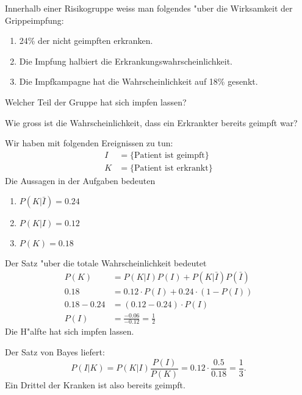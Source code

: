 Innerhalb einer Risiko\-gruppe weiss man folgendes "uber die Wirksamkeit
der Grippe\-impfung:
\begin{enumerate}
\item 24\% der nicht geimpften erkranken.
\item Die Impfung halbiert die Erkrankungswahrscheinlichkeit.
\item Die Impfkampagne hat die Wahrscheinlichkeit
auf 18\% gesenkt.
\end{enumerate}
\begin{teilaufgaben}
\item Welcher Teil der Gruppe hat sich impfen lassen?
\item Wie gross ist die Wahrscheinlichkeit, dass ein Erkrankter
bereits geimpft war?
\end{teilaufgaben}

\begin{loesung}
Wir haben mit folgenden Ereignissen zu tun:
\begin{align*}
I&=\{\text{Patient ist geimpft}\}\\
K&=\{\text{Patient ist erkrankt}\}
\end{align*}
Die Aussagen in der Aufgaben bedeuten
\begin{enumerate}
\item $P(K|\bar I)=0.24$
\item $P(K|I)=0.12$
\item $P(K)=0.18$
\end{enumerate}
\begin{teilaufgaben}
\item
Der Satz "uber die totale Wahrscheinlichkeit bedeutet
\begin{align*}
P(K)&=P(K|I)P(I)+P(K|\bar I)P(\bar I)
\\
0.18&=0.12\cdot P(I)+0.24\cdot (1-P(I))
\\
0.18-0.24&=(0.12-0.24)\cdot P(I)
\\
P(I)&=\frac{-0.06}{-0.12}=\frac12
\end{align*}
Die H"alfte hat sich impfen lassen.
\item
Der Satz von Bayes liefert:
\[
P(I|K)=P(K|I)\frac{P(I)}{P(K)}=0.12\cdot\frac{0.5}{0.18}=\frac13.
\]
Ein Drittel der Kranken ist also bereits geimpft.
\qedhere
\end{teilaufgaben}
\end{loesung}

